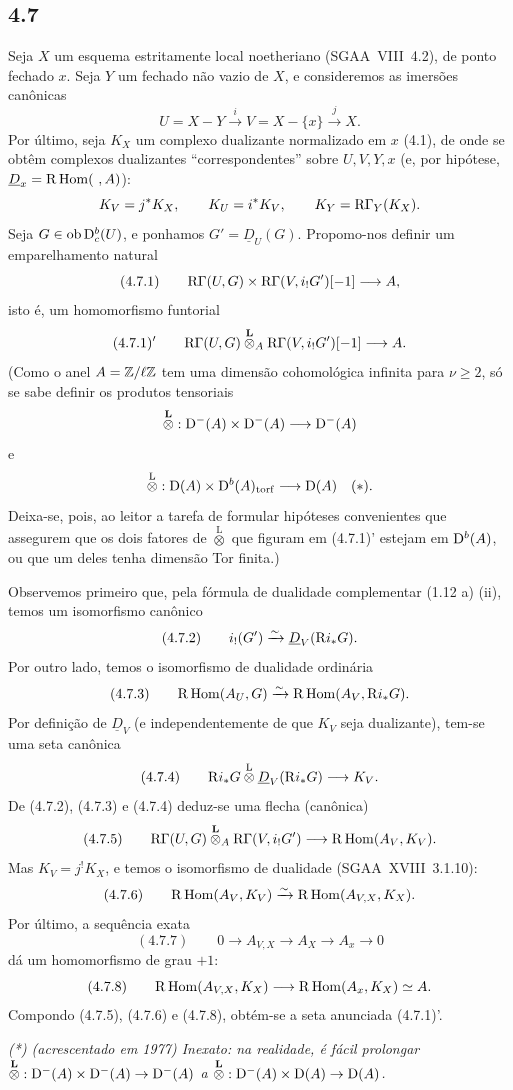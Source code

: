 \subsection*{4.7}
Seja $X$ um esquema estritamente local noetheriano (SGAA~VIII~4.2), de ponto fechado $x$. Seja $Y$ um fechado não vazio de $X$, e consideremos as imersões canônicas
\[
U=X-Y\xrightarrow{i}V=X-\{x\}\xrightarrow{j}X.
\]
Por último, seja $K_X$ um complexo dualizante normalizado em $x$ (4.1), de onde se obtêm complexos dualizantes \textquotedblleft correspondentes\textquotedblright{} sobre $U,V,Y,x$ (e, por hipótese, $\underline{D}_x=\R\Hom(\ ,A)$):
\[
K_V=j^*K_X,
\qquad K_U=i^*K_V,
\qquad K_Y=\mathrm{R}\Gamma_Y(K_X).
\]
Seja $G\in\operatorname{ob}\mathrm{D}_c^b(U)$, e ponhamos $G'=\underline{D}_U(G)$. Propomo-nos definir um emparelhamento natural
\[
(4.7.1)\qquad \mathrm{R}\Gamma(U,G)\times \mathrm{R}\Gamma(V,i_!G')[-1]\longrightarrow A,
\]
isto é, um homomorfismo funtorial
\[
(4.7.1)'\qquad \mathrm{R}\Gamma(U,G)\overset{\mathbf L}{\otimes}_A\mathrm{R}\Gamma(V,i_!G')[-1]\longrightarrow A.
\]
(Como o anel $A=\mathbb{Z}/\ell\mathbb{Z}$ tem uma dimensão cohomológica infinita para $\nu\geqslant2$, só se sabe definir os produtos tensoriais
\[
\overset{\mathbf L}{\otimes}:\mathrm{D}^-(A)\times\mathrm{D}^-(A)\longrightarrow\mathrm{D}^-(A)
\]
e
\[
\overset{\mathrm L}{\otimes}:\mathrm{D}(A)\times\mathrm{D}^b(A)_{\mathrm{torf}}\longrightarrow\mathrm{D}(A)\quad(*).
\]
Deixa-se, pois, ao leitor a tarefa de formular hipóteses convenientes que assegurem que os dois fatores de $\overset{\mathrm L}{\otimes}$ que figuram em (4.7.1)' estejam em $\mathrm{D}^b(A)$, ou que um deles tenha dimensão Tor finita.)

Observemos primeiro que, pela fórmula de dualidade complementar (1.12 a) (ii), temos um isomorfismo canônico
\[
(4.7.2)\qquad i_!(G')\xrightarrow{\sim}\underline{D}_V(\mathrm{R} i_*G).
\]
Por outro lado, temos o isomorfismo de dualidade ordinária
\[
(4.7.3)\qquad \mathrm{R}\operatorname{Hom}(A_U,G)\xrightarrow{\sim}\mathrm{R}\operatorname{Hom}(A_V,\mathrm{R} i_*G).
\]
Por definição de $\underline{D}_V$ (e independentemente de que $K_V$ seja dualizante), tem-se uma seta canônica
\[
(4.7.4)\qquad \mathrm{R} i_*G\overset{\mathrm L}{\otimes}\underline{D}_V(\mathrm{R} i_*G)\longrightarrow K_V.
\]
De (4.7.2), (4.7.3) e (4.7.4) deduz-se uma flecha (canônica)
\[
(4.7.5)\qquad \mathrm{R}\Gamma(U,G)\overset{\mathbf L}{\otimes}_A\mathrm{R}\Gamma(V,i_!G')\longrightarrow \mathrm{R}\operatorname{Hom}(A_V,K_V).
\]
Mas $K_V=j^{!}K_X$, e temos o isomorfismo de dualidade (SGAA~XVIII~3.1.10):
\[
(4.7.6)\qquad \mathrm{R}\operatorname{Hom}(A_V,K_V)\xrightarrow{\sim}\mathrm{R}\operatorname{Hom}(A_{V,X},K_X).
\]
Por último, a sequência exata
\[
(4.7.7)\qquad 0\longrightarrow A_{V,X}\longrightarrow A_X\longrightarrow A_x\longrightarrow 0
\]
dá um homomorfismo de grau $+1$:
\[
(4.7.8)\qquad \mathrm{R}\operatorname{Hom}(A_{V,X},K_X)\longrightarrow \mathrm{R}\operatorname{Hom}(A_x,K_X)\simeq A.
\]
Compondo (4.7.5), (4.7.6) e (4.7.8), obtém-se a seta anunciada (4.7.1)'.

\emph{(*) (acrescentado em 1977) Inexato: na realidade, é fácil prolongar $\overset{\mathbf L}{\otimes}:\mathrm{D}^-(A)\times\mathrm{D}^-(A)\to\mathrm{D}^-(A)$ a $\overset{\mathbf L}{\otimes}:\mathrm{D}^-(A)\times\mathrm{D}(A)\to\mathrm{D}(A)$.}
